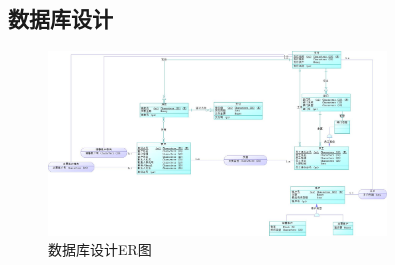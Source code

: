 \documentclass{article}
\begin{document}
    \subsection{数据库设计}
    \begin{figure}[H]
        \centering
        \includegraphics[width=0.8\textwidth]{./fig/cdm.jpg}
        \caption[er]{数据库设计ER图}
    \end{figure}
\end{document}
